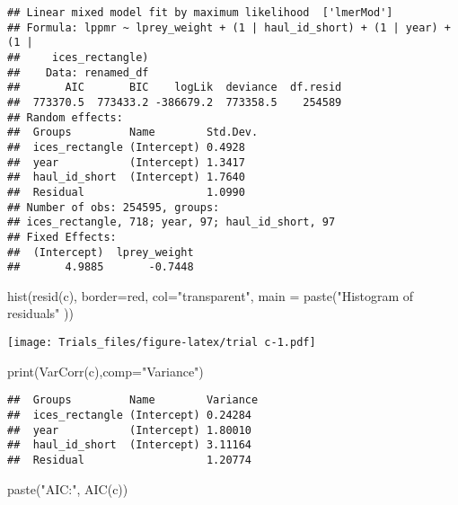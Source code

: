 \documentclass[
]{article}
\newenvironment{Shaded}{\begin{snugshade}}{\end{snugshade}}
\newcommand{\AttributeTok}[1]{\textcolor[rgb]{0.77,0.63,0.00}{#1}}
\newcommand{\FunctionTok}[1]{\textcolor[rgb]{0.00,0.00,0.00}{#1}}
\newcommand{\NormalTok}[1]{#1}
\newcommand{\StringTok}[1]{\textcolor[rgb]{0.31,0.60,0.02}{#1}}
\begin{document}
\begin{verbatim}
## Linear mixed model fit by maximum likelihood  ['lmerMod']
## Formula: lppmr ~ lprey_weight + (1 | haul_id_short) + (1 | year) + (1 |  
##     ices_rectangle)
##    Data: renamed_df
##       AIC       BIC    logLik  deviance  df.resid 
##  773370.5  773433.2 -386679.2  773358.5    254589 
## Random effects:
##  Groups         Name        Std.Dev.
##  ices_rectangle (Intercept) 0.4928  
##  year           (Intercept) 1.3417  
##  haul_id_short  (Intercept) 1.7640  
##  Residual                   1.0990  
## Number of obs: 254595, groups:  
## ices_rectangle, 718; year, 97; haul_id_short, 97
## Fixed Effects:
##  (Intercept)  lprey_weight  
##       4.9885       -0.7448
\end{verbatim}

\begin{Shaded}
\begin{Highlighting}[]
\FunctionTok{hist}\NormalTok{(}\FunctionTok{resid}\NormalTok{(c), }\AttributeTok{border=}\StringTok{\textquotesingle{}red\textquotesingle{}}\NormalTok{, }\AttributeTok{col=}\StringTok{"transparent"}\NormalTok{, }\AttributeTok{main =} \FunctionTok{paste}\NormalTok{(}\StringTok{"Histogram of residuals"}\NormalTok{ ))}
\end{Highlighting}
\end{Shaded}

\texttt{[image: Trials\_files/figure-latex/trial c-1.pdf]}

\begin{Shaded}
\begin{Highlighting}[]
\FunctionTok{print}\NormalTok{(}\FunctionTok{VarCorr}\NormalTok{(c),}\AttributeTok{comp=}\StringTok{"Variance"}\NormalTok{)}
\end{Highlighting}
\end{Shaded}

\begin{verbatim}
##  Groups         Name        Variance
##  ices_rectangle (Intercept) 0.24284 
##  year           (Intercept) 1.80010 
##  haul_id_short  (Intercept) 3.11164 
##  Residual                   1.20774
\end{verbatim}

\begin{Shaded}
\begin{Highlighting}[]
\FunctionTok{paste}\NormalTok{(}\StringTok{"AIC:"}\NormalTok{, }\FunctionTok{AIC}\NormalTok{(c))}
\end{Highlighting}
\end{Shaded}
\end{document}

